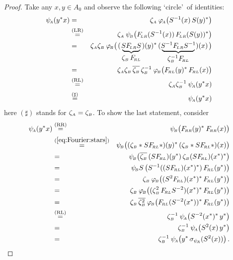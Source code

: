 \begin{proof}
Take any $x, y \in A_0$ and observe the following \lq circle\rq\ of identities:
\begin{eqnarray*}
\psiA(y^* x)
&=&
\zetaA \: \phiA \! \left(S^{-1}(x) \, S(y)^* \vertM \right)  \\
&\stackrel{(\mbox{\scriptsize LR})}{=}&
\zetaA \: \psiB \!\left(\FLR(S^{-1}(x))\, \FLR(S(y))^* \vertM \right)\\
&=&
\zetaA\zetaB \: \phiB \! \left(\vertM \right. \!
          (\,\underbrace{\! S \FLR S\!}_{\textstyle \zetaB \, \FRL}\,)(y)^*
       \, (\,\underbrace{\!S^{-1}\FLR S^{-1}\!}_{\textstyle \zetaB^{-1} \FRL}\,)(x)
                   \! \left. \vertM  \right)  \\
&=&
\zetaA\zetaB \, \overline{\zetaB} \, \zetaB^{-1}
    \: \phiB \! \left(\FRL(y)^* \, \FRL(x) \vertM \right) \\
&\stackrel{(\mbox{\scriptsize RL})}{=}&
\zetaA \zetaB^{-1}  \:\psiA(y^* x)  \\
&\stackrel{(\sharp)}{=}&
\psiA(y^* x)
\end{eqnarray*}
here $(\sharp)$ stands for $\zeta_{\scriptscriptstyle A}=\zeta_{\scriptscriptstyle B}$.
To show the last statement, consider
\begin{eqnarray*}
\psiA(y^* x)
&\stackrel{(\mbox{\scriptsize RR})}{=}&
\psiB \! \left(\FRR(y)^* \: \FRR(x) \vertM  \right)  \\
&\stackrel{\rm (\ref{eq:Fourier:stars})}{=}&
\psiB \! \left((\zetaB *S \FRL*)(y)^* \,  (\zetaB *S \FRL*)(x) \vertM  \right)  \\
&=&
\psiB \! \left(\overline{\zetaB}\,(S \FRL)(y^*) \, \zetaB (S \FRL)(x^*)^* \vertM  \right)  \\
&=&
\psiB S \left(S^{-1}((S \FRL)(x^*)^*)  \, \FRL(y^*) \vertM  \right)  \\
&=&
\zetaB \: \phiB \! \left((S^2 \FRL)(x^*)^* \, \FRL(y^*) \vertM  \right)  \\
&=&
\zetaB \: \phiB \! \left((\zetaB^2 \, \FRL S^{-2})(x^*)^*
                            \, \FRL(y^*) \vertM  \right)  \\
&=&
\zetaB \, \overline{\zetaB^2} \:
       \phiB \! \left(\FRL(S^{-2}(x^*))^* \, \FRL(y^*) \vertM  \right)  \\
&\stackrel{(\mbox{\scriptsize RL})}{=}&
\zetaB^{-1} \: \psiA \! \left(S^{-2}(x^*)^* \, y^* \vertM  \right)  \\
&=&
\zetaB^{-1} \: \psiA \! \left(S^{2}(x) \,y^* \vertM  \right)  \\
&=&
\zetaB^{-1} \: \psiA \! \left(y^* \, \sigma_{\psiA}(S^{2}(x)) \vertM  \right).  \\

\end{eqnarray*}
\end{proof}
